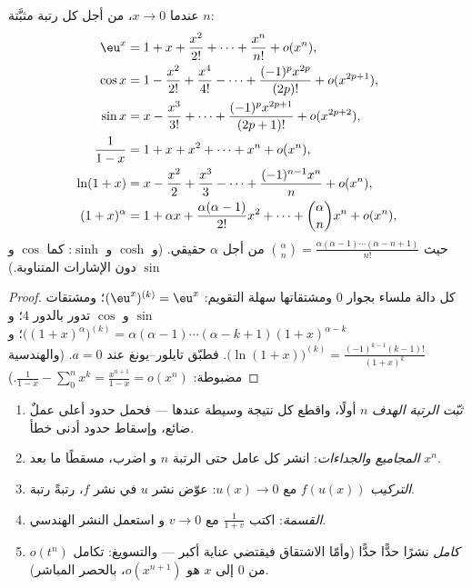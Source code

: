 \begin{proposition}
عندما $x \to 0$، من أجل كل رتبة مثبَّتة $n$:
\begin{align*}
\eu^x &= 1 + x + \frac{x^2}{2!} + \dots + \frac{x^n}{n!} + o(x^n),\\
\cos x &= 1 - \frac{x^2}{2!} + \frac{x^4}{4!} - \dots
+ \frac{(-1)^p x^{2p}}{(2p)!} + o(x^{2p+1}),\\
\sin x &= x - \frac{x^3}{3!} + \dots + \frac{(-1)^p
x^{2p+1}}{(2p+1)!} + o(x^{2p+2}),\\
\frac{1}{1 - x} &= 1 + x + x^2 + \dots + x^n + o(x^n),\\
\ln(1 + x) &= x - \frac{x^2}{2} + \frac{x^3}{3} - \dots +
\frac{(-1)^{n-1} x^n}{n} + o(x^n),\\
(1 + x)^\alpha &= 1 + \alpha x + \frac{\alpha(\alpha-1)}{2!}x^2 +
\dots + \binom{\alpha}{n} x^n + o(x^n),
\end{align*}
حيث $\binom{\alpha}{n} = \frac{\alpha(\alpha - 1)\cdots(\alpha - n
+ 1)}{n!}$ من أجل $\alpha$ حقيقي. (و $\cosh$ و $\sinh$: كما $\cos$ و
$\sin$ دون الإشارات المتناوبة.)
\label{prop:b1:taylor:standard}
\end{proposition}

\begin{proof}
كل دالة ملساء بجوار $0$ ومشتقاتها سهلة التقويم:
$(\eu^x)^{(k)} = \eu^x$؛ ومشتقات $\sin$ و $\cos$ تدور
بالدور $4$؛ و $\bigl((1+x)^\alpha\bigr)^{(k)} = \alpha(\alpha -
1)\cdots(\alpha - k + 1)(1+x)^{\alpha - k}$؛
و $\bigl(\ln(1+x)\bigr)^{(k)} = \frac{(-1)^{k-1}(k-1)!}{(1+x)^k}$.
فطبّق تايلور--يونغ عند $a = 0$. (والهندسية مضبوطة:
$\frac{1}{1-x} - \sum_0^n x^k = \frac{x^{n+1}}{1 - x} = o(x^n)$.)
\end{proof}

\begin{method}\label{met:b1:taylor:compute}
\begin{enumerate}
  \item \emph{ثبّت الرتبة الهدف} $n$ أولًا، واقطع كل نتيجة
        وسيطة عندها --- فحمل حدود أعلى عملٌ ضائع،
        وإسقاط حدود أدنى خطأ.
  \item \emph{المجاميع والجداءات}: انشر كل عامل حتى الرتبة $n$ و
        اضرب، مسقطًا ما بعد $x^n$.
  \item \emph{التركيب} $f(u(x))$ مع $u(x) \to 0$: عوّض
        نشر $u$ في نشر $f$، رتبةً رتبة.
  \item \emph{القسمة}: اكتب $\frac{1}{1 + v}$ مع $v \to 0$ و
        استعمل النشر الهندسي.
  \item \emph{كامل} نشرًا حدًّا حدًّا (وأمّا الاشتقاق
        فيقتضي عناية أكبر --- والتسويغ: تكامل $o(t^n)$
        من $0$ إلى $x$ هو $o(x^{n+1})$، بالحصر المباشر).
\end{enumerate}
\end{method}

